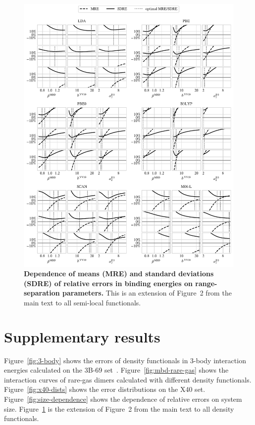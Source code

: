 \documentclass[twocolumn]{article}
\renewcommand\cite{\citep}
\begin{document}
\begin{figure}
\includegraphics[center]{media/param-fitting-all}
\caption{\textbf{Dependence of means (MRE) and standard deviations (SDRE) of relative errors in binding energies on range-separation parameters.}
This is an extension of Figure~2 from the main text to all semi-local functionals.
}\label{fig:param-fitting-all}
\end{figure}

\section{Supplementary results}

Figure~\ref{fig:3-body} shows the errors of density functionals in 3-body interaction energies calculated on the 3B-69 set~\cite{RezacJCTC15}.
Figure~\ref{fig:mbd-rare-gas} shows the interaction curves of rare-gas dimers calculated with different density functionals.
Figure~\ref{fig:x40-dists} shows the error distributions on the X40 set.
Figure~\ref{fig:size-dependence} shows the dependence of relative errors on system size.
Figure~\ref{fig:param-fitting-all} is the extension of Figure~2 from the main text to all density functionals.

\begingroup
\renewcommand{\section}[2]{}
\setlength\bibsep{0pt}
\footnotesize

\endgroup
\end{document}
